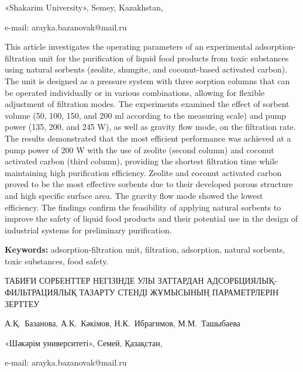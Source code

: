 \begin{affil}
«Shakarim University», Semey, Kazakhstan,

e-mail: arayka.bazanovak@mail.ru
\end{affil}

This article investigates the operating parameters of an experimental
adsorption-filtration unit for the purification of liquid food products
from toxic substances using natural sorbents (zeolite, shungite, and
coconut-based activated carbon). The unit is designed as a pressure
system with three sorption columns that can be operated individually or
in various combinations, allowing for flexible adjustment of filtration
modes. The experiments examined the effect of sorbent volume (50, 100,
150, and 200 ml according to the measuring scale) and pump power (135,
200, and 245 W), as well as gravity flow mode, on the filtration rate.
The results demonstrated that the most efficient performance was
achieved at a pump power of 200 W with the use of zeolite (second
column) and coconut activated carbon (third column), providing the
shortest filtration time while maintaining high purification efficiency.
Zeolite and coconut activated carbon proved to be the most effective
sorbents due to their developed porous structure and high specific
surface area. The gravity flow mode showed the lowest efficiency. The
findings confirm the feasibility of applying natural sorbents to improve
the safety of liquid food products and their potential use in the design
of industrial systems for preliminary purification.

{\bfseries Keywords:} adsorption-filtration unit, filtration, adsorption,
natural sorbents, toxic substances, food safety.

\begin{header}
ТАБИҒИ СОРБЕНТТЕР НЕГІЗІНДЕ УЛЫ ЗАТТАРДАН АДСОРБЦИЯЛЫҚ-ФИЛЬТРАЦИЯЛЫҚ ТАЗАРТУ СТЕНДІ ЖҰМЫСЫНЫҢ ПАРАМЕТРЛЕРІН ЗЕРТТЕУ

А.Қ.~Базанова\envelope,
А.К.~Кәкімов,
Н.К.~Ибрагимов,
М.М.~Ташыбаева
\end{header}

\begin{affil}
«Шәкәрім университеті», Семей, Қазақстан,

e-mail: arayka.bazanovak@mail.ru
\end{affil}

